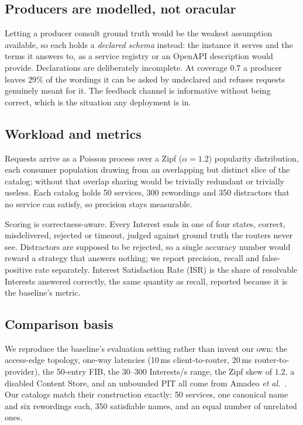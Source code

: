 \documentclass[conference,a4paper]{IEEEtran}
\begin{document}
\subsection{Producers are modelled, not oracular}

Letting a producer consult ground truth would be the weakest assumption
available, so each holds a \emph{declared schema} instead: the instance it
serves and the terms it answers to, as a service registry or an OpenAPI
description would provide. Declarations are deliberately incomplete. At
coverage $0.7$ a producer leaves $29\%$ of the wordings it can be asked by
undeclared and refuses requests genuinely meant for it. The feedback channel
is informative without being correct, which is the situation any deployment
is in.

\subsection{Workload and metrics}

Requests arrive as a Poisson process over a Zipf ($\alpha=1.2$) popularity
distribution, each consumer population drawing from an overlapping but
distinct slice of the catalog; without that overlap sharing would be
trivially redundant or trivially useless. Each catalog holds 50 services, 300
rewordings and 350 distractors that no service can satisfy, so precision
stays measurable.

Scoring is correctness-aware. Every Interest ends in one of four states,
correct, misdelivered, rejected or timeout, judged against ground truth the
routers never see. Distractors are supposed to be rejected, so a single
accuracy number would reward a strategy that answers nothing; we report
precision, recall and false-positive rate separately. Interest Satisfaction
Rate (ISR) is the share of resolvable Interests answered correctly, the same
quantity as recall, reported because it is the baseline's metric.

\subsection{Comparison basis}
\label{sec:basis}

We reproduce the baseline's evaluation setting rather than invent our own:
the access-edge topology, one-way latencies (10\,ms client-to-router,
20\,ms router-to-provider), the 50-entry FIB, the 30--300 Interests/s
range, the Zipf skew of $1.2$, a disabled Content Store, and an unbounded
PIT all come from Amadeo \emph{et al.}~\cite{amadeo2026}. Our catalogs
match their construction exactly: 50 services, one canonical name and six
rewordings each, 350 satisfiable names, and an equal number of unrelated
ones.
\end{document}
